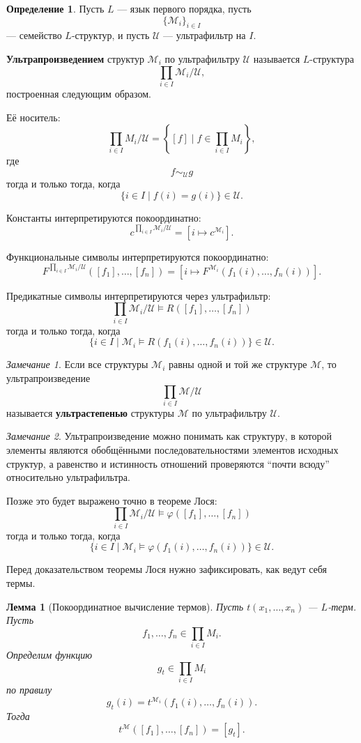 \documentclass[12pt,a4paper,oneside,openany]{book}
\theoremstyle{definition}
\newtheorem{definition}{Определение}[chapter]
\theoremstyle{plain}
\newtheorem{lemma}{Лемма}[chapter]
\theoremstyle{remark}
\newtheorem{remark}{Замечание}[chapter]
\begin{document}
\begin{definition}
Пусть $L$ — язык первого порядка, пусть
\[
\{\mathcal M_i\}_{i\in I}
\]
— семейство $L$-структур, и пусть $\mathcal U$ — ультрафильтр на $I$.

\textbf{Ультрапроизведением} структур $\mathcal M_i$ по ультрафильтру $\mathcal U$ называется $L$-структура
\[
\prod_{i\in I}\mathcal M_i/\mathcal U,
\]
построенная следующим образом.

Её носитель:
\[
\prod_{i\in I}M_i/\mathcal U
=
\left\{[f]\mid f\in\prod_{i\in I}M_i\right\},
\]
где
\[
f\sim_{\mathcal U} g
\]
тогда и только тогда, когда
\[
\{i\in I\mid f(i)=g(i)\}\in\mathcal U.
\]

Константы интерпретируются покоординатно:
\[
c^{\prod_{i\in I}\mathcal M_i/\mathcal U}
=
[i\mapsto c^{\mathcal M_i}].
\]

Функциональные символы интерпретируются покоординатно:
\[
F^{\prod_{i\in I}\mathcal M_i/\mathcal U}
([f_1],\ldots,[f_n])
=
\left[
i\mapsto
F^{\mathcal M_i}(f_1(i),\ldots,f_n(i))
\right].
\]

Предикатные символы интерпретируются через ультрафильтр:
\[
\prod_{i\in I}\mathcal M_i/\mathcal U
\models
R([f_1],\ldots,[f_n])
\]
тогда и только тогда, когда
\[
\{i\in I\mid
\mathcal M_i\models R(f_1(i),\ldots,f_n(i))
\}\in\mathcal U.
\]
\end{definition}

\begin{remark}
Если все структуры $\mathcal M_i$ равны одной и той же структуре $\mathcal M$, то ультрапроизведение
\[
\prod_{i\in I}\mathcal M/\mathcal U
\]
называется \textbf{ультрастепенью} структуры $\mathcal M$ по ультрафильтру $\mathcal U$.
\end{remark}

\begin{remark}
Ультрапроизведение можно понимать как структуру, в которой элементы являются обобщёнными последовательностями элементов исходных структур, а равенство и истинность отношений проверяются ``почти всюду'' относительно ультрафильтра.

Позже это будет выражено точно в теореме Лося:
\[
\prod_{i\in I}\mathcal M_i/\mathcal U
\models
\varphi([f_1],\ldots,[f_n])
\]
тогда и только тогда, когда
\[
\{i\in I\mid
\mathcal M_i\models
\varphi(f_1(i),\ldots,f_n(i))
\}\in\mathcal U.
\]
\end{remark}

Перед доказательством теоремы Лося нужно зафиксировать, как ведут себя термы.

\begin{lemma}[Покоординатное вычисление термов]
Пусть $t(x_1,\ldots,x_n)$ — $L$-терм. Пусть
\[
f_1,\ldots,f_n\in\prod_{i\in I}M_i.
\]
Определим функцию
\[
g_t\in\prod_{i\in I}M_i
\]
по правилу
\[
g_t(i)=
t^{\mathcal M_i}(f_1(i),\ldots,f_n(i)).
\]
Тогда
\[
t^{\mathcal M}([f_1],\ldots,[f_n])
=
[g_t].
\]
\end{lemma}
\end{document}
